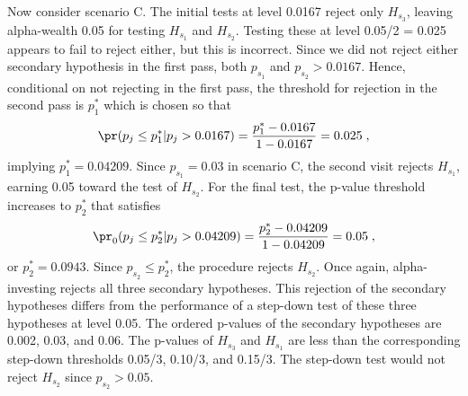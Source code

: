 \documentclass[12pt]{article}
\begin{document}
 Now consider scenario C.  The initial tests at level 0.0167 reject only
 $H_{s_3}$, leaving alpha-wealth 0.05 for testing $H_{s_1}$ and $H_{s_2}$.
  Testing these at level 0.05/2 = 0.025 appears to fail to reject either, but
 this is incorrect.  Since we did not reject either secondary hypothesis in the
 first pass, both $p_{s_1}$ and $p_{s_2} > 0.0167$.  Hence, conditional on not
 rejecting in the first pass, the threshold for rejection in the second pass is
 $p_1^{*}$ which is chosen so that
\begin{equation}
    \pr(p_j \le p_1^{*} | p_j > 0.0167) 
        = \frac{p_1^{*} - 0.0167}{1-0.0167} = 0.025 \;,
\label{eq:p1s}
\end{equation}
 implying $p_1^{*} = 0.04209$.  Since $p_{s_1} = 0.03$ in scenario C, the second
 visit rejects $H_{s_1}$, earning 0.05 toward the test of $H_{s_2}$.  For the
 final test, the p-value threshold increases to $p_2^{*}$ that satisfies
\begin{equation}
    \pr_0(p_j \le p_2^{*} | p_j > 0.04209) 
        = \frac{p_2^{*} - 0.04209}{1-0.04209} = 0.05 \;,
\label{eq:p2s}
\end{equation}
 or $p_2^{*} = 0.0943$.  Since $p_{s_2} \le p_2^{*}$, the procedure rejects
 $H_{s_2}$.  Once again, alpha-investing rejects all three secondary hypotheses.
  This rejection of the secondary hypotheses differs from the performance of a
 step-down test of these three hypotheses at level 0.05.  The ordered p-values
 of the secondary hypotheses are 0.002, 0.03, and 0.06.  The p-values of
 $H_{s_3}$ and $H_{s_1}$ are less than the corresponding step-down thresholds
 0.05/3, 0.10/3, and 0.15/3. The step-down test would not reject $H_{s_2}$ since
 $p_{s_2} > 0.05$.
\end{document}
